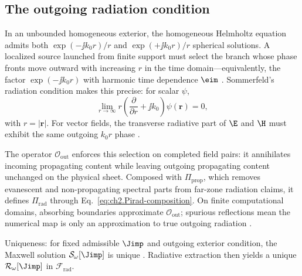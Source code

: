 \subsection{The outgoing radiation condition}
\label{sec:ch02.4.2}

In an unbounded homogeneous exterior, the homogeneous Helmholtz equation admits both $\exp(-\jj k_0 r)/r$ and $\exp(+\jj k_0 r)/r$ spherical solutions. A localized source launched from finite support must select the branch whose phase fronts move outward with increasing $r$ in the time domain---equivalently, the factor $\exp(-\jj k_0 r)$ with harmonic time dependence $\eim$ \cite{stratton1941}. Sommerfeld's radiation condition makes this precise: for scalar $\psi$,
\begin{equation}
\label{eq:ch2.sommerfeld-scalar}
\lim_{r\to\infty} r\left(\frac{\partial}{\partial r}+\jj k_0\right)\psi(\mathbf{r})=0,
\end{equation}
with $r=|\mathbf{r}|$. For vector fields, the transverse radiative part of $\E$ and $\H$ must exhibit the same outgoing $k_0 r$ phase \cite{stratton1941,harrington2001}.

The operator $\mathcal{O}_{\mathrm{out}}$ enforces this selection on completed field pairs: it annihilates incoming propagating content while leaving outgoing propagating content unchanged on the physical sheet. Composed with $\Pi_{\mathrm{prop}}$, which removes evanescent and non-propagating spectral parts from far-zone radiation claims, it defines $\Pi_{\mathrm{rad}}$ through Eq.~\eqref{eq:ch2.Pirad-composition}. On finite computational domains, absorbing boundaries approximate $\mathcal{O}_{\mathrm{out}}$; spurious reflections mean the numerical map is only an approximation to true outgoing radiation \cite{hansen1988}.

Uniqueness: for fixed admissible $\Jimp$ and outgoing exterior condition, the Maxwell solution $\mathcal{S}_\omega[\Jimp]$ is unique \cite{stratton1941}. Radiative extraction then yields a unique $\mathcal{R}_\omega[\Jimp]$ in $\mathcal{F}_{\mathrm{rad}}$.
